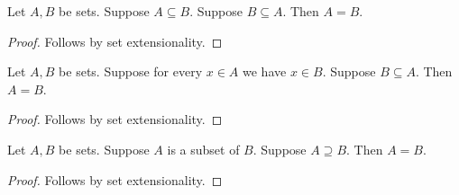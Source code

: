 

\begin{proposition}\label{subset_set_extensionality}
    Let $A,B$ be sets.
    Suppose $A\subseteq B$.
    Suppose $B\subseteq A$.
    Then $A=B$.
\end{proposition}
\begin{proof}
    Follows by set extensionality.
\end{proof}

\begin{proposition}\label{mixed_subset_set_extensionality}
    Let $A,B$ be sets.
    Suppose for every $x\in A$ we have $x\in B$.
    Suppose $B\subseteq A$.
    Then $A=B$.
\end{proposition}
\begin{proof}
    Follows by set extensionality.
\end{proof}

\begin{proposition}\label{chained_subset_set_extensionality}
    Let $A,B$ be sets.
    Suppose $A$ is a subset of $B$.
    Suppose $A\supseteq B$.
    Then $A=B$.
\end{proposition}
\begin{proof}
    Follows by set extensionality.
\end{proof}
